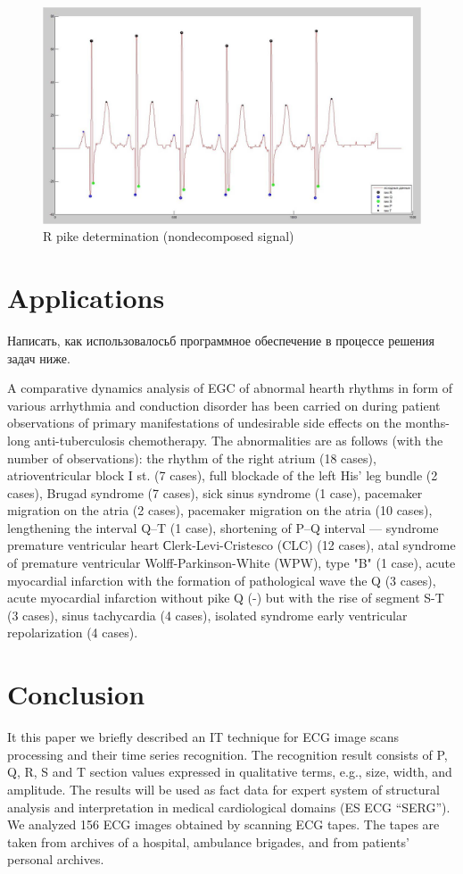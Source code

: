 \documentclass[runningheads]{AIIT}
\newcommand{\nnn}[2][rcolor]{\noindent%
\textcolor{eclr}{}\textcolor{#1}{#2}\textcolor{eclr}{}}
\begin{document}
\begin{figure}[htb]
  \centering
    \includegraphics[width=0.5\linewidth] {images/NonDecomposed.jpg}
  \caption{R pike determination (nondecomposed signal)}
  \label{fig:fig7}
\end{figure}

\section{Applications}
\label{sec:applications}

\nnn{Написать, как использовалосьб программное обеспечение в процессе решения задач ниже.}

A comparative dynamics analysis of EGC of abnormal hearth rhythms in form of various arrhythmia and conduction disorder has been carried on during patient observations of primary manifestations of undesirable side effects on the months-long anti-tuberculosis chemotherapy.  The abnormalities are as follows (with the number of observations): the rhythm of the right atrium (18 cases), atrioventricular block I st. (7 cases), full blockade of the left His'  leg bundle (2 cases), Brugad syndrome (7 cases), sick sinus syndrome (1 case), pacemaker migration on the atria (2 cases), pacemaker migration on the atria (10 cases), lengthening the interval Q--T (1 case), shortening of P--Q interval --- syndrome premature ventricular heart Сlerk-Levi-Cristesco (CLC) (12 cases), atal syndrome of premature ventricular Wolff-Parkinson-White (WPW), type "B" (1 case), acute myocardial infarction with the formation of pathological wave the Q (3 cases), acute myocardial infarction without pike Q (-) but with the rise of segment S-T (3 cases), sinus tachycardia (4 cases), isolated syndrome early ventricular repolarization (4 cases).


\section*{Conclusion}
It this paper we briefly described an IT technique for ECG image scans processing and their time series recognition.  The recognition result consists of P, Q, R, S and T section values expressed in qualitative terms, e.g., size, width, and amplitude.  The results will be used as fact data for expert system of structural analysis and interpretation in medical cardiological domains (ES ECG ``SERG'').  We analyzed 156 ECG images obtained by scanning ECG tapes.  The tapes are taken from archives of a hospital, ambulance brigades, and from patients' personal archives.
\end{document}
